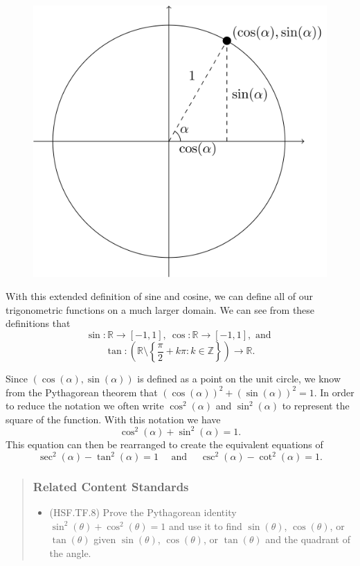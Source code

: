 \documentclass[
]{book}
\providecommand{\tightlist}{%
  \setlength{\itemsep}{0pt}\setlength{\parskip}{0pt}}
\theoremstyle{definition}
\theoremstyle{definition}
\theoremstyle{definition}
\theoremstyle{remark}
\begin{document}
\begin{figure}

{\centering \includegraphics[width=0.5\linewidth]{tikz/unit-circle-trigonometry} 

}

\end{figure}

With this extended definition of sine and cosine, we can define all of our trigonometric functions on a much larger domain. We can see from these definitions that \[\sin:\mathbb{R}\rightarrow [-1,1], \: \cos:\mathbb{R} \rightarrow [-1,1], \mbox{ and }\] \[ \tan: \left( \mathbb{R}\setminus \left\{\frac{\pi}{2} + k\pi: k \in \mathbb{Z}\right\}\right) \rightarrow \mathbb{R}.\]

Since \((\cos(\alpha),\sin(\alpha))\) is defined as a point on the unit circle, we know from the Pythagorean theorem that \(\left(\cos(\alpha)\right)^2 + \left(\sin(\alpha)\right)^2 = 1\). In order to reduce the notation we often write \(\cos^2(\alpha)\) and \(\sin^2(\alpha)\) to represent the square of the function. With this notation we have \[\cos^2(\alpha) +\sin^2(\alpha) = 1.\]
This equation can then be rearranged to create the equivalent equations of
\[\sec^2(\alpha) -\tan^2(\alpha) = 1 \quad \mbox{ and } \quad \csc^2(\alpha)-\cot^2(\alpha) = 1.\]

\begin{quote}
\hypertarget{related-content-standards-56}{%
\subsubsection*{Related Content Standards}\label{related-content-standards-56}}

\begin{itemize}
\tightlist
\item
  (HSF.TF.8) Prove the Pythagorean identity \(\sin^2(\theta) + \cos^2(\theta) = 1\) and use it to find \(\sin(\theta)\), \(\cos(\theta)\), or \(\tan(\theta)\) given \(\sin(\theta)\), \(\cos(\theta)\), or \(\tan(\theta)\) and the quadrant of the angle.
\end{itemize}
\end{quote}
\end{document}
